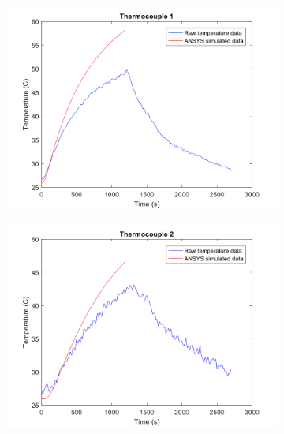 \documentclass[letterpaper,titlepage,oneside]{report}
\begin{document}
\begin{figure}[ht]
  \centering
  \begin{subfigure}[h]{0.4\textwidth}
    \includegraphics[width=1\textwidth]{ansys1}
  \end{subfigure}
  \quad
  \begin{subfigure}[h]{0.4\textwidth}
    \includegraphics[width=1\textwidth]{ansys2}
  \end{subfigure}
  \\
  \begin{subfigure}[h]{0.4\textwidth}

\end{subfigure}
\end{figure}
\end{document}
